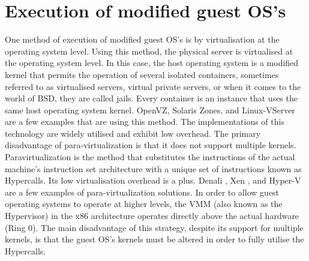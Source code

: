 \section{Execution of modified guest OS's}
One method of execution of modified guest OS’s is by
virtualisation at the operating system level. Using this
method, the physical server is virtualised at the operating
system level. In this case, the host operating system is a
modified kernel that permits the operation of several
isolated containers, sometimes referred to as virtualised
servers, virtual private servers, or when it comes to the
world of BSD, they are called jails. Every container is an
instance that uses the same host operating system kernel.
OpenVZ, Solaris Zones, and Linux-VServer are a few
examples that are using this method. The
implementations of this technology are widely utilised
and exhibit low overhead. The primary disadvantage of
para-virtualization is that it does not support multiple
kernels. Paravirtualization is the method that substitutes
the instructions of the actual machine's instruction set
architecture with a unique set of instructions known as
Hypercalls. Its low virtualisation overhead is a plus.
Denali \cite{citation_11}, Xen \cite{citation_5}, and Hyper-V \cite{citation_12} are a few
examples of para-virtualization solutions. In order to
allow guest operating systems to operate at higher levels,
the VMM (also known as the Hypervisor) in the x86
architecture operates directly above the actual hardware
(Ring 0). The main disadvantage of this strategy, despite
its support for multiple kernels, is that the guest OS’s
kernels must be altered in order to fully utilise the
Hypercalls. 